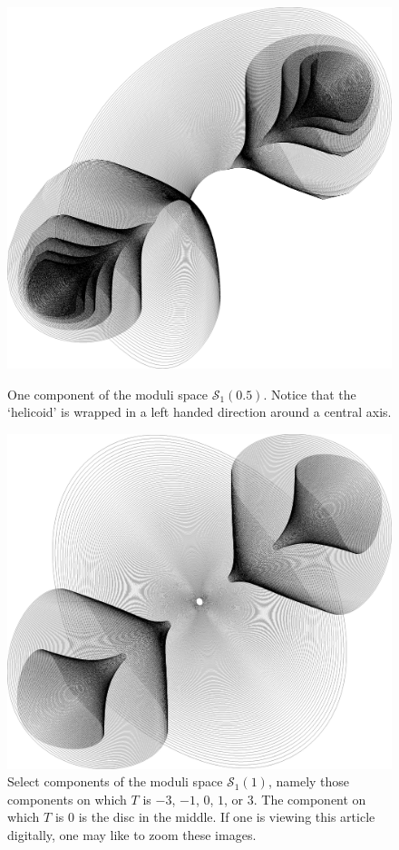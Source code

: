 \documentclass{article}
\begin{document}
\begin{figure}[p]
    \centering
    \includegraphics[height=0.4\textheight]{graphics/moduli_plot_p05.png}
    \caption{One component of the moduli space $\mathcal{S}_1(0.5)$. Notice that the `helicoid' is wrapped in a left handed direction around a central axis.\label{fig:p05 plot}}

    \vspace*{\floatsep}

    \includegraphics[height=0.37\textheight]{graphics/moduli_plot_p1.png}
    \caption{Select components of the moduli space $\mathcal{S}_1(1)$, namely those components on which $T$ is $-3$, $-1$, $0$, $1$, or $3$. The component on which $T$ is $0$ is the disc in the middle. If one is viewing this article digitally, one may like to zoom these images.\label{fig:p1 plot}}
\end{figure}
\end{document}
